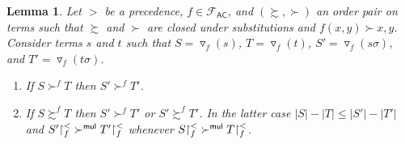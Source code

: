 \documentclass{tlp}
\newtheorem{lemma}[theorem]{Lemma}
\newcommand{\tf}[1]{{\triangledown_{\!#1}}}
\newcommand{\m}[1]{\mathsf{#1}}
\newcommand{\mc}[1]{\mathcal{#1}}
\newcommand{\mr}[1]{\mathrm{#1}}
\newcommand{\mul}{\m{mul}}
\newcommand{\FF}{\mc{F}}
\newcommand{\AC}{\mr{\m{AC}}}
\newcommand{\rrs}[3][f]{{#2}{\restriction}^{\smash{#3}}_{#1}}
\newcommand{\GT}{\mathrel{\succ}}
\newcommand{\GS}{\mathrel{\succsim}}
\begin{document}
\begin{lemma}
\label{lem:f-key}
Let $>$ be a precedence, $f \in \FF_\AC$, and $({\GS},{\GT})$ an order pair
on terms such that $\GS$ and $\GT$ are closed under substitutions and
$f(x,y) \GT x, y$.
Consider terms $s$ and $t$ such that $S = \tf{f}(s)$,
$T = \tf{f}(t)$, $S' = \tf{f}(s\sigma)$, and $T' = \tf{f}(t\sigma)$.
\begin{enumerate}
\item
If $S \GT^f T$ then $S' \GT^f T'$.
\item
If $S \GS^f T$ then $S' \GT^f T'$ or $S' \GS^f T'$. In the
latter case
$|S| - |T| \leqslant |S'| - |T'|$ and
$\rrs{S'}{<} \GT^\mul \rrs{T'}{<}$ whenever
$\rrs{S}{<} \GT^\mul \rrs{T}{<}$.
\end{enumerate}
\end{lemma}
\end{document}
